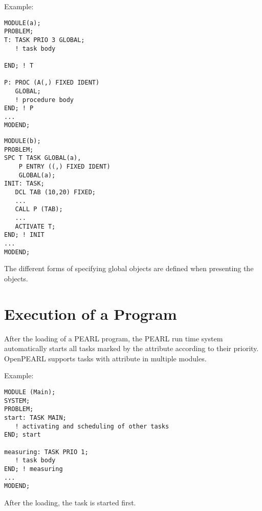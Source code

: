 
Example:

\begin{multicols}{2}
\begin{lstlisting}
MODULE(a);
PROBLEM; 
T: TASK PRIO 3 GLOBAL;
   ! task body
	
END; ! T
        
P: PROC (A(,) FIXED IDENT)
   GLOBAL;       
   ! procedure body
END; ! P         
...             
MODEND;     

\end{lstlisting}
\columnbreak
\begin{lstlisting}
MODULE(b);
PROBLEM; 
SPC T TASK GLOBAL(a),
    P ENTRY ((,) FIXED IDENT)
    GLOBAL(a);
INIT: TASK;
   DCL TAB (10,20) FIXED;
   ...
   CALL P (TAB);
   ... 
   ACTIVATE T;
END; ! INIT
...
MODEND;
\end{lstlisting}
\end{multicols}

The different forms of specifying global objects are defined when
presenting the objects.

\section{Execution of a Program}   %
\label{sec_program_execution}

After the loading of a PEARL program, the PEARL run time system
automatically starts all tasks marked by the attribute  according
to their priority.  
OpenPEARL supports tasks with attribute  in multiple modules.

Example:

\begin{lstlisting}
MODULE (Main); 
SYSTEM; 
PROBLEM;
start: TASK MAIN;
   ! activating and scheduling of other tasks
END; start
             
measuring: TASK PRIO 1;
   ! task body 
END; ! measuring
...    
MODEND;
\end{lstlisting}

After the loading, the task  is started first.

